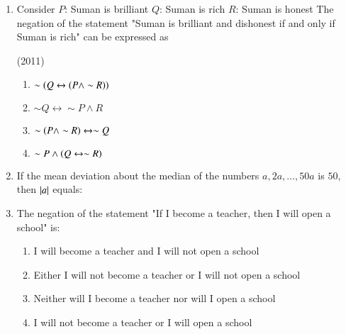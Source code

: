 \documentclass[journal,12pt,twocolumn]{IEEEtran}
\theoremstyle{remark}
\begin{document}
\begin{enumerate}
    \item Consider \newline
    $P$: Suman is brilliant\newline
    $Q$: Suman is rich\newline
    $R$: Suman is honest\newline
    The negation of the statement "Suman is brilliant and dishonest if and only if Suman is rich" can be expressed as
    
    \hfill{(2011)}
    \begin{enumerate}
    \item $\sim \left(Q \leftrightarrow \left(P \land \sim R\right)\right)$
    \item $\sim Q \leftrightarrow \sim P \land R$
    \item $\sim \left(P \land \sim R\right) \leftrightarrow \sim Q$
    \item $\sim P \land \left(Q \leftrightarrow \sim R\right)$
    \end{enumerate}
    
    \item If the mean deviation about the median of the numbers $a, 2a, \dots, 50a$ is $50$, then $\left\vert a\right\vert$ equals:
    
    \hfill{}
    \begin{enumerate}
    \end{enumerate}
    
    \item The negation of the statement\newline
    "If I become a teacher, then I will open a school" is:
    
    \hfill{}
    \begin{enumerate}
        \item I will become a teacher and I will not open a school
        \item Either I will not become a teacher or I will not open a school
        \item Neither will I become a teacher nor will I open a school
        \item I will not become a teacher or I will open a school
    \end{enumerate}
    

\end{enumerate}
\end{document}

